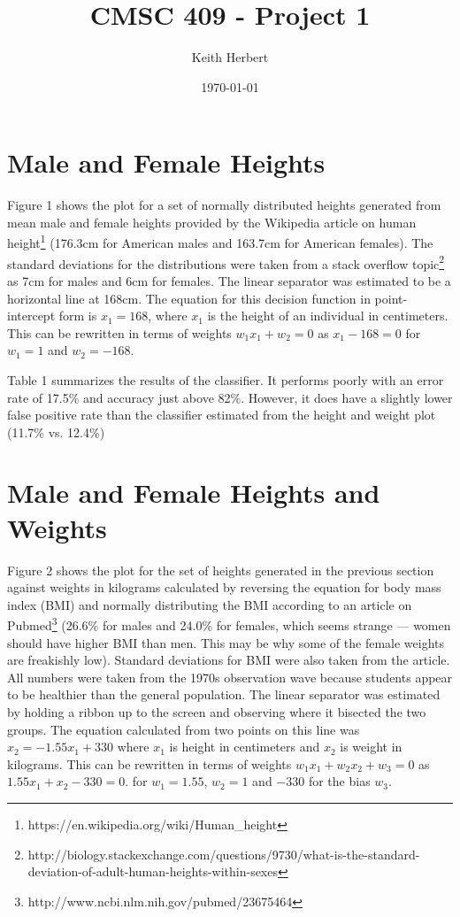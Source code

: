 \documentclass[10pt,letterpaper]{hitec}
\author{Keith Herbert}
\title{CMSC 409 - Project 1}
\date{\today}
\begin{document}
\maketitle
\section*{Male and Female Heights}
Figure 1 shows the plot for a set of normally distributed heights generated from mean male and female heights provided by the Wikipedia article on human height\footnote{https://en.wikipedia.org/wiki/Human\_height}
(176.3cm for American males and 163.7cm for American females). The standard deviations for the distributions were taken from a stack overflow topic\footnote{http://biology.stackexchange.com/questions/9730/what-is-the-standard-deviation-of-adult-human-heights-within-sexes} 
as 7cm for males and 6cm for females. The linear separator was estimated to be a horizontal line at 168cm. The equation for this decision function in point-intercept form is $x_1 = 168$, where $x_1$ is the height of an individual in centimeters. This can be rewritten in terms of weights $w_1 x_1 + w_2 = 0$ as $x_1 - 168 = 0$ for $w_1 = 1$ and $w_2 = -168$. 

Table 1 summarizes the results of the classifier. It performs poorly with an error rate of 17.5\% and accuracy just above 82\%. However, it does have a slightly lower false positive rate than the classifier estimated from the height and weight plot (11.7\% vs. 12.4\%)
     

\section*{Male and Female Heights and Weights}
Figure 2 shows the plot for the set of heights generated in the previous section against weights in kilograms calculated by reversing the equation for body mass index (BMI) and normally distributing the BMI according to an article on Pubmed\footnote{http://www.ncbi.nlm.nih.gov/pubmed/23675464} (26.6\% for males and 24.0\% for females, which seems strange --- women should have higher BMI than men. This may be why some of the female weights are freakishly low). Standard deviations for BMI were also taken from the article. All numbers were taken from the 1970s observation wave because students appear to be healthier than the general population. The linear separator was estimated by holding a ribbon up to the screen and observing where it bisected the two groups. The equation calculated from two points on this line was $x_2 = -1.55x_1 + 330$ where $x_1$ is height in centimeters and $x_2$ is weight in kilograms. This can be rewritten in terms of weights $w_1 x_1 + w_2 x_2 + w_3 = 0$ as $1.55x_1 + x_2 - 330 = 0$. for $w_1 = 1.55$, $w_2 = 1$ and $-330$ for the bias $w_3$. 
\end{document}
